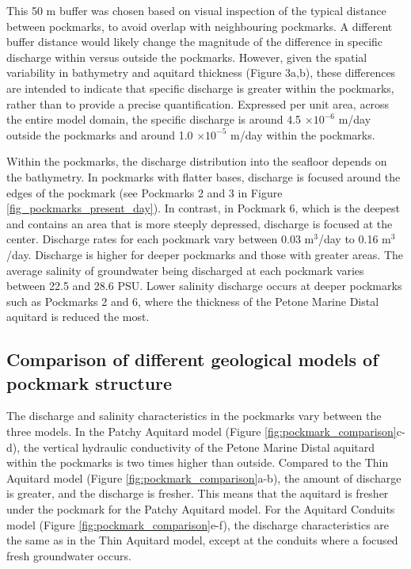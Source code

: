 \documentclass[draft, 10pt]{agujournal2019}
\begin{document}
This 50 m buffer was chosen based on visual inspection of the typical distance between pockmarks, to avoid overlap with neighbouring pockmarks.
A different buffer distance would likely change the magnitude of the difference in specific discharge within versus outside the pockmarks.
However, given the spatial variability in bathymetry and aquitard thickness (Figure 3a,b), these differences are intended to
indicate that specific discharge is greater within the pockmarks, rather than to provide a precise quantification.
Expressed per unit area, across the entire model domain, the specific discharge is around 4.5 $\times 10^{-6}$ m/day outside the pockmarks and around 1.0 $\times 10^{-5}$ m/day within the pockmarks.

Within the pockmarks, the discharge distribution into the seafloor depends on the bathymetry.
In pockmarks with flatter bases, discharge is focused around the edges of the pockmark (see Pockmarks 2 and 3 in Figure \ref{fig_pockmarks_present_day}).
In contrast, in Pockmark 6, which is the deepest and contains an area that is more steeply depressed, discharge is focused at the center.
Discharge rates for each pockmark vary between 0.03 m$^3$/day to 0.16 m$^3$/day. Discharge is higher for deeper pockmarks and those with greater areas.
The average salinity of groundwater being discharged at each pockmark varies between 22.5 and 28.6 PSU.
Lower salinity discharge occurs at deeper pockmarks such as Pockmarks 2 and 6, where the thickness of the Petone Marine Distal aquitard is reduced the most.

\subsection{Comparison of different geological models of pockmark structure}
The discharge and salinity characteristics in the pockmarks vary between the three models.
In the Patchy Aquitard model (Figure \ref{fig:pockmark_comparison}c-d),
the vertical hydraulic conductivity of the Petone Marine Distal aquitard within the pockmarks is two times higher than outside.
Compared to the Thin Aquitard model (Figure \ref{fig:pockmark_comparison}a-b), the amount of discharge is greater, and the discharge is fresher.
This means that the aquitard is fresher under the pockmark for the Patchy Aquitard model.
For the Aquitard Conduits model (Figure \ref{fig:pockmark_comparison}e-f), the discharge characteristics are the same as in the Thin Aquitard model,
except at the conduits where a focused fresh groundwater occurs.
\end{document}
